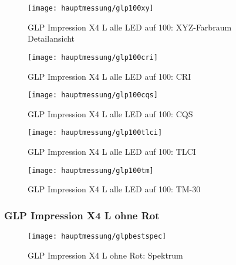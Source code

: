 \documentclass[pagesize,paper=A4,fontsize=12pt,utf8,numbers=noenddot,bibliography=totoc,listof=totoc,DIV=11,BCOR=1mm]{scrreprt}
\begin{document}
\begin{figure}[htp]     %
\centering
\texttt{[image: hauptmessung/glp100xy]} 
\caption {GLP Impression X4 L alle LED auf 100: XYZ-Farbraum Detailansicht} 
\end{figure}

\begin{figure}[htp]     %
\centering
\texttt{[image: hauptmessung/glp100cri]} 
\caption {GLP Impression X4 L alle LED auf 100: CRI} 
\end{figure}

\begin{figure}[htp]     %
\centering
\texttt{[image: hauptmessung/glp100cqs]} 
\caption {GLP Impression X4 L alle LED auf 100: CQS} 
\end{figure}

\begin{figure}[htp]     %
\centering
\texttt{[image: hauptmessung/glp100tlci]} 
\caption {GLP Impression X4 L alle LED auf 100: TLCI} 
\end{figure}

\begin{figure}[htp]     %
\centering
\texttt{[image: hauptmessung/glp100tm]} 
\caption {GLP Impression X4 L alle LED auf 100: TM-30} 
\end{figure}

\subsubsection{GLP Impression X4 L ohne Rot}

\begin{figure}[htp]     %
\centering
\texttt{[image: hauptmessung/glpbestspec]} 
\caption {GLP Impression X4 L ohne Rot: Spektrum} 
\end{figure}
\end{document}
